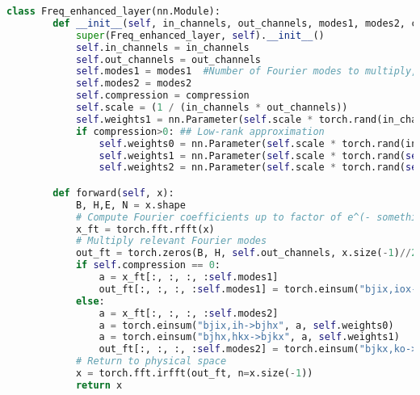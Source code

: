 \documentclass{article}
\begin{document}
\begin{algorithm}[h]
	\caption{Frequency Enhanced Layer}
	\label{alg:code0}
    
    \begin{lstlisting}[language=python]
    class Freq_enhanced_layer(nn.Module):
        def __init__(self, in_channels, out_channels, modes1, modes2, compression=0):
            super(Freq_enhanced_layer, self).__init__()
            self.in_channels = in_channels
            self.out_channels = out_channels
            self.modes1 = modes1  #Number of Fourier modes to multiply, at most floor(N/2) + 1
            self.modes2 = modes2
            self.compression = compression 
            self.scale = (1 / (in_channels * out_channels))
            self.weights1 = nn.Parameter(self.scale * torch.rand(in_channels, out_channels, self.modes1))
            if compression>0: ## Low-rank approximation 
                self.weights0 = nn.Parameter(self.scale * torch.rand(in_channels, self.compression, dtype=torch.cfloat))
                self.weights1 = nn.Parameter(self.scale * torch.rand(self.compression, self.compression, len(self.index), dtype=torch.cfloat))
                self.weights2 = nn.Parameter(self.scale * torch.rand(self.compression, out_channels, dtype=torch.cfloat))

        def forward(self, x):
            B, H,E, N = x.shape
            # Compute Fourier coefficients up to factor of e^(- something constant)
            x_ft = torch.fft.rfft(x)
            # Multiply relevant Fourier modes
            out_ft = torch.zeros(B, H, self.out_channels, x.size(-1)//2 + 1)
            if self.compression == 0:
                a = x_ft[:, :, :, :self.modes1]
                out_ft[:, :, :, :self.modes1] = torch.einsum("bjix,iox->bjox", a, self.weights1)
            else:
                a = x_ft[:, :, :, :self.modes2]
                a = torch.einsum("bjix,ih->bjhx", a, self.weights0)
                a = torch.einsum("bjhx,hkx->bjkx", a, self.weights1)
                out_ft[:, :, :, :self.modes2] = torch.einsum("bjkx,ko->bjox", a, self.weights2)
            # Return to physical space
            x = torch.fft.irfft(out_ft, n=x.size(-1))
            return x
    \end{lstlisting}
\end{algorithm}
 
\end{document}
